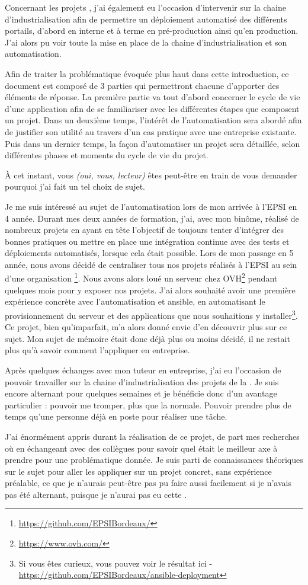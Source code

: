 Concernant les projets \naq, j'ai également eu l'occasion d'intervenir sur la chaine d'industrialisation afin de permettre un déploiement automatisé des différents portails, d'abord en interne et à terme en pré-production ainsi qu'en production. J'ai alors pu voir toute la mise en place de la chaine d'industrialisation et son automatisation.

Afin de traiter la problématique évoquée plus haut dans cette introduction, ce document est composé de 3 parties qui permettront chacune d'apporter des éléments de réponse. La première partie va tout d'abord concerner le cycle de vie d'une application afin de se familiariser avec les différentes étapes que composent un projet. Dans un deuxième temps, l'intérêt de l'automatisation sera abordé afin de justifier son utilité au travers d'un cas pratique avec une entreprise existante. Puis dans un dernier temps, la façon d'automatiser un projet sera détaillée, selon différentes phases et moments du cycle de vie du projet.

À cet instant, vous \emph{(oui, vous, lecteur)} êtes peut-être en train de vous demander pourquoi j'ai fait un tel choix de sujet. 

Je me suis intéressé au sujet de l'automatisation lors de mon arrivée à l'EPSI en 4 année. Durant mes deux années de formation, j'ai, avec mon binôme, réalisé de nombreux projets en ayant en tête l'objectif de toujours tenter d'intégrer des bonnes pratiques ou mettre en place une intégration continue avec des tests et déploiements automatisés, lorsque cela était possible. Lors de mon passage en 5 année, nous avons décidé de centraliser tous nos projets réalisés à l'EPSI au sein d'une organisation \github\footnote{\url{https://github.com/EPSIBordeaux/}}. Nous avons alors loué un serveur chez OVH\footnote{\url{https://www.ovh.com/}} pendant quelques mois pour y exposer nos projets. J'ai alors souhaité avoir une première expérience concrète avec l'automatisation et ansible, en automatisant le provisionnement du serveur et des applications que nous souhaitions y installer\footnote{Si vous êtes curieux, vous pouvez voir le résultat ici - \url{https://github.com/EPSIBordeaux/ansible-deployment}}. Ce projet, bien qu'imparfait, m'a alors donné envie d'en découvrir plus sur ce sujet. Mon sujet de mémoire était donc déjà plus ou moins décidé, il ne restait plus qu'à savoir comment l'appliquer en entreprise.

Après quelques échanges avec mon tuteur en entreprise, j'ai eu l'occasion de pouvoir travailler sur la chaine d'industrialisation des projets de la \naq. Je suis encore alternant pour quelques semaines et je bénéficie donc d'un avantage particulier : pouvoir me tromper, plus que la normale. Pouvoir prendre plus de temps qu'une personne déjà en poste pour réaliser une tâche.

J'ai énormément appris durant la réalisation de ce projet, de part mes recherches où en échangeant avec des collègues pour savoir quel était le meilleur axe à prendre pour une problématique donnée. Je suis parti de connaissances théoriques sur le sujet pour aller les appliquer sur un projet concret, sans expérience préalable, ce que je n'aurais peut-être pas pu faire aussi facilement si je n'avais pas été alternant, puisque je n'aurai pas eu cette .
